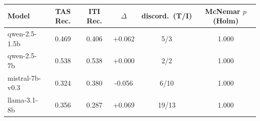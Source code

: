 \begin{tabular}{lccccc}
\toprule
Model & TAS Rec. & ITI Rec. & $\Delta$ & discord.\ (T/I) & McNemar $p$ (Holm) \\
\midrule
qwen-2.5-1.5b & 0.469 & 0.406 & +0.062 & 5/3 & 1.000 \\
qwen-2.5-7b & 0.538 & 0.538 & +0.000 & 2/2 & 1.000 \\
mistral-7b-v0.3 & 0.324 & 0.380 & -0.056 & 6/10 & 1.000 \\
llama-3.1-8b & 0.356 & 0.287 & +0.069 & 19/13 & 1.000 \\
\bottomrule
\end{tabular}